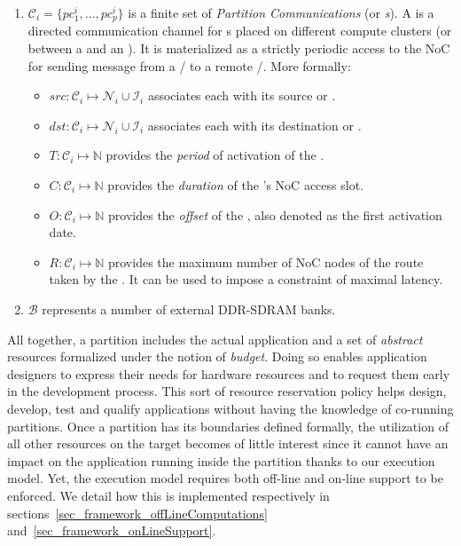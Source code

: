 \documentclass[main.tex]{subfiles}
\begin{document}
\begin{enumerate}
    \item $\mathcal{C}_i = \{ pc_1^i , \ldots , pc_p^i \}$ is a finite set
        of \emph{Partition Communications} (or \emph{\PC{}s}). A \PC{} is a
        directed communication channel for \PN{}s placed on different
        compute clusters (or between a \PN{} and an \ION{}). It is
        materialized as a strictly periodic access to the NoC for sending
        message from a \PN{}/\ION{} to a remote \PN{}/\ION{}. More
        formally:
        \begin{itemize}
            \item $src : \mathcal{C}_i \mapsto \mathcal{N}_i \cup \mathcal{I}_i$ associates each \PC{} with its source \PN{} or \ION{}.
            \item $dst : \mathcal{C}_i \mapsto \mathcal{N}_i \cup \mathcal{I}_i$ associates each \PC{} with its destination \PN{} or \ION{}.
            \item $T : \mathcal{C}_i \mapsto \mathbb{N}$ provides the
                \emph{period} of activation of the \PC{}.
            \item $C : \mathcal{C}_i \mapsto \mathbb{N}$ provides the
                \emph{duration} of the \PC{}'s NoC access slot.
            \item $O : \mathcal{C}_i \mapsto \mathbb{N}$ provides the
                \emph{offset} of the \PC{}, also denoted as the first
                activation date.
            \item $R : \mathcal{C}_i \mapsto \mathbb{N}$ provides the
                maximum number of NoC nodes of the route taken by the
                \PC{}. It can be used to impose a constraint of maximal
                latency.

        \end{itemize}

    \item $\mathcal{B}$ represents a number of external DDR-SDRAM banks.
\end{enumerate}

All together, a partition includes the actual application and a set of
\emph{abstract} resources formalized under the notion of \emph{budget}. Doing
so enables application designers to express their needs for hardware resources
and to request them early in the development process. This sort of resource
reservation policy helps design, develop, test and qualify applications without
having the knowledge of co-running partitions. Once a partition has its
boundaries defined formally, the utilization of all other resources on the
target becomes of little interest since it cannot have an impact on the
application running inside the partition thanks to our execution model. Yet,
the execution model requires both off-line and on-line support to be enforced.
We detail how this is implemented respectively in
sections~\ref{sec_framework_offLineComputations}
and~\ref{sec_framework_onLineSupport}.
\end{document}
